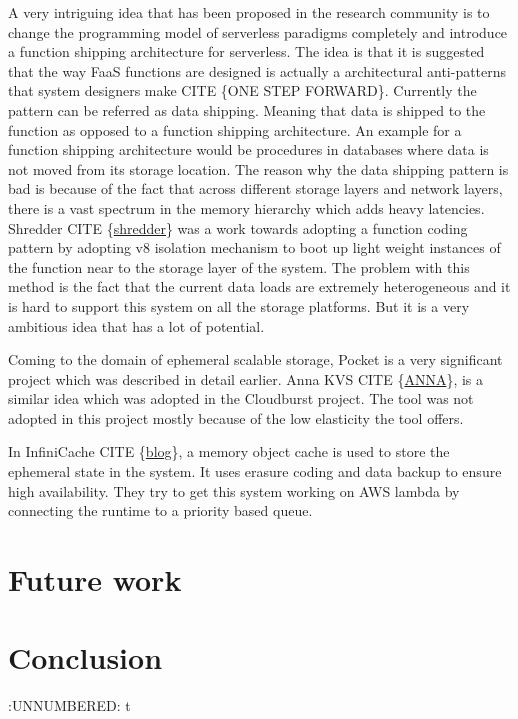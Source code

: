 \documentclass[12pt,titlepage]{article}
\begin{document}
A very intriguing idea that has been proposed in the research community is to
change the programming model of serverless paradigms completely and introduce a
function shipping architecture for serverless. The idea is that it is suggested
that the way FaaS functions are designed is actually a architectural
anti-patterns that system designers make CITE \{ONE STEP FORWARD\}. Currently the
pattern can be referred as data shipping. Meaning that data is shipped to the
function as opposed to a function shipping architecture. An example for a
function shipping architecture would be procedures in databases where data is
not moved from its storage location. The reason why the data shipping pattern is
bad is because of the fact that across different storage layers and network
layers, there is a vast spectrum in the memory hierarchy which adds heavy
latencies. Shredder CITE \{\href{https://www.cs.utah.edu/\~dongx/paper/sandstorm-socc.pdf}{shredder}\} was a work towards adopting a function
coding pattern by adopting v8 isolation mechanism to boot up light weight
instances of the function near to the storage layer of the system. The problem
with this method is the fact that the current data loads are extremely
heterogeneous and it is hard to support this system on all the storage
platforms. But it is a very ambitious idea that has a lot of potential.

Coming to the domain of ephemeral scalable storage, Pocket is a very significant
project which was described in detail earlier. Anna KVS CITE \{\href{https://dsf.berkeley.edu/jmh/papers/anna\_ieee18.pdf}{ANNA}\}, is a
similar idea which was adopted in the Cloudburst project. The tool was not
adopted in this project mostly because of the low elasticity the tool offers.


In InfiniCache CITE \{\href{https://www.usenix.org/conference/fast20/presentation/wang-ao}{blog}\}, a memory object cache is used to store the ephemeral
state in the system. It uses erasure coding and data backup to ensure high availability. 
They try to get this system working on AWS lambda by connecting the runtime to a
priority based queue. 

\section{Future work}
\label{sec:orgca9115b}
\section{Conclusion}
\label{sec:org356318f}


:UNNUMBERED: t
\end{document}
